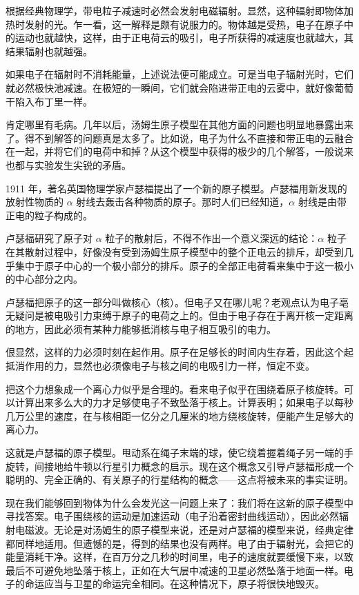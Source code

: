 根据经典物理学，带电粒子减速时必然会发射电磁辐射。显然，这种辐射即物体加热时发射的光。乍一看，这一解释是颇有说服力的。物体越是受热，电子在原子中的运动也就越快，这样，由于正电荷云的吸引，电子所获得的减速度也就越大，其结果辐射也就越强。

如果电子在辐射时不消耗能量，上述说法便可能成立。可是当电子辐射光时，它们就必然极快池减速。在极短的一瞬间，它们就会陷进带正电的云雾中，就好像葡萄干陷入布丁里一样。

肯定哪里有毛病。几年以后，汤姆生原子模型在其他方面的问题也明显地暴露出来了。得不到解答的问题真是太多了。比如说，电子为什么不直接和带正电的云融合在一起，并将它们的电荷中和掉？从这个模型中获得的极少的几个解答，一般说来也都与实验发生尖锐的矛盾。

1911 年，著名英国物理学家卢瑟福提出了一个新的原子模型。卢瑟福用新发现的放射性物质的 $\alpha$ 射线去轰击各种物质的原子。那时人们已经知道，$\alpha$ 射线是由带正电的粒子构成的。

卢瑟福研究了原子对 $\alpha$ 粒子的散射后，不得不作出一个意义深远的结论：$\alpha$ 粒子在其散射过程中，好像没有受到汤姆生原子模型中的整个正电云的排斥，却受到几乎集中于原子中心的一个极小部分的排斥。原子的全部正电荷看来集中于这一极小的中心部分之内。

卢瑟福把原子的这一部分叫做核心（核）。但电子又在哪儿呢？老观点认为电子亳无疑问是被电吸引力束缚于原子的电荷之上的。但由于电子存在于离开核一定距离的地方，因此必须有某种力能够抵消核与电子相互吸引的电力。

佷显然，这样的力必须时刻在起作用。原子在足够长的时间内生存着，因此这个起抵消作用的力，显然也必须像电子与核之间的电吸引力一样，恒定不变。

把这个力想象成一个离心力似乎是合理的。看来电子似乎在围绕着原子核旋转。可以计算出来多么大的力才足够使电子不致坠落于核上。计算表明；如果电子以每秒几万公里的速度，在与核相距一亿分之几厘米的地方绕核旋转，便能产生足够大的离心力。

这就是卢瑟福的原子模型。甩动系在绳子末端的球，使它绕着握着绳子另一端的手旋转，间接地给牛顿以行星引力概念的启示。现在这个概念又引导卢瑟福形成一个聪明的、完全正确的、有关原子的行星结构的概念——这点将被未来的事实证明。

现在我们能够回到物体为什么会发光这一问题上来了：我们将在这新的原子模型中寻找答案。电子围绕核的运动是加速运动（电子沿着密封曲线运动），因此必然辐射电磁波。无论是对汤姆生的原子模型来说，还是对卢瑟福的模型来说，经典定律都同样地适用。但遗憾的是，得到的结果也没有两样。电了由于辐射光，会把它的能量消耗干净。这样，在百万分之几秒的时间里，电子的速度就要缓慢下来，以致最后不可避免地坠落于核上，正如在大气层中减速的卫星必然坠落于地面一样。电子的命运应当与卫星的命运完全相同。在这种情况下，原子将很快地毁灭。

